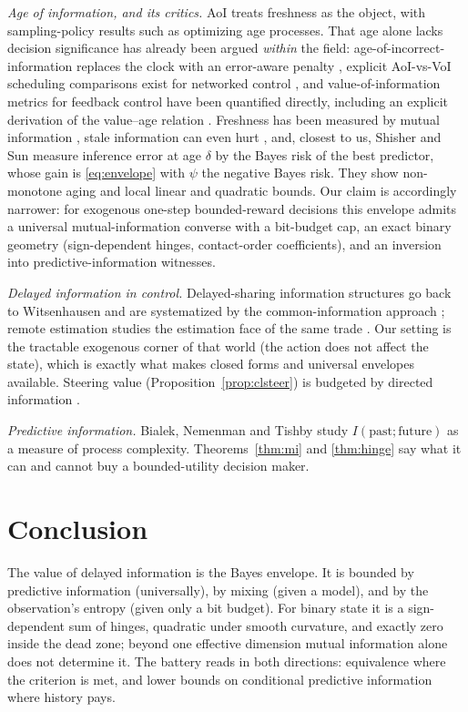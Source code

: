 \documentclass[11pt]{article}
\begin{document}
\emph{Age of information, and its critics.} AoI \cite{yates21} treats
freshness as the object, with sampling-policy results such as \cite{sun17}
optimizing age processes. That age alone lacks decision significance has
already been argued \emph{within} the field: age-of-incorrect-information
replaces the clock with an error-aware penalty \cite{maatouk20}, explicit
AoI-vs-VoI scheduling comparisons exist for networked control
\cite{ayan19}, and value-of-information metrics for feedback control have
been quantified directly, including an explicit derivation of the
value--age relation \cite{soleymani22,valueage24}. Freshness has been
measured by mutual information \cite{suncyr19,wangbadiucoon22}, stale
information can even hurt \cite{mitzenmacher00}, and, closest to us,
Shisher and Sun \cite{shishersun22} measure inference error at age
$\delta$ by the Bayes risk of the best predictor, whose gain is
\eqref{eq:envelope} with $\psi$ the negative Bayes risk. They show
non-monotone aging and local linear and quadratic bounds. Our claim is
accordingly narrower: for exogenous one-step bounded-reward decisions this
envelope admits a universal mutual-information converse with a bit-budget
cap, an exact binary geometry (sign-dependent hinges, contact-order
coefficients), and an inversion into predictive-information witnesses.

\emph{Delayed information in control.} Delayed-sharing information
structures go back to Witsenhausen \cite{witsenhausen71} and are
systematized by the common-information approach \cite{nayyar13}; remote
estimation studies the estimation face of the same trade
\cite{sunpolyanskiy20}. Our setting is the tractable exogenous corner of that world
(the action does not affect the state), which is exactly what makes
closed forms and universal envelopes available. Steering value
(Proposition~\ref{prop:clsteer}) is budgeted by directed information
\cite{kostinahassibi19,sabag23}.

\emph{Predictive information.} Bialek, Nemenman and Tishby
\cite{bialek01} study $I(\text{past};\text{future})$ as a measure of
process complexity. Theorems~\ref{thm:mi} and \ref{thm:hinge} say what it
can and cannot buy a bounded-utility decision maker.

\section{Conclusion}\label{sec:conclusion}

The value of delayed information is the Bayes envelope. It is bounded by
predictive information (universally), by mixing (given a model), and by
the observation's entropy (given only a bit budget). For binary state it
is a sign-dependent sum of hinges, quadratic under smooth curvature, and
exactly zero inside the dead zone; beyond one effective dimension mutual
information alone does not determine it. The battery reads in both
directions: equivalence where the criterion is met, and lower bounds on
conditional predictive information where history pays.
\end{document}
